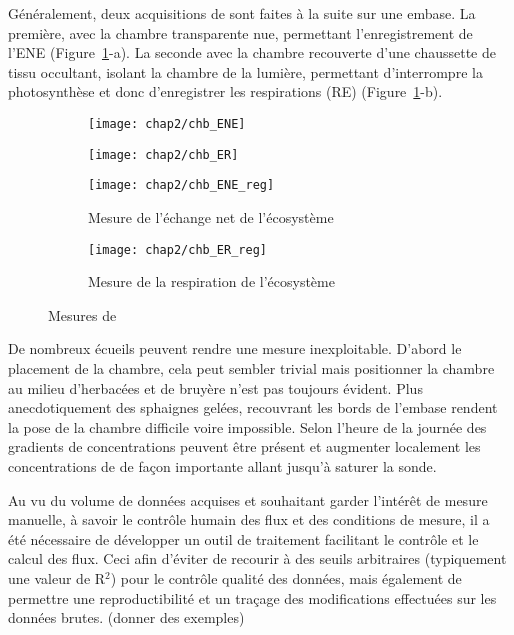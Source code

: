 Généralement, deux acquisitions de \coo sont faites à la suite sur une embase.
La première, avec la chambre transparente nue, permettant l'enregistrement de l'ENE (Figure~\ref{fig:chb}-a).
La seconde avec la chambre recouverte d'une chaussette de tissu occultant, isolant la chambre de la lumière, permettant d'interrompre la photosynthèse et donc d'enregistrer les respirations (RE) (Figure~\ref{fig:chb}-b).

\begin{figure}
	\centering
	\begin{subfigure}[t]{0.5\textwidth}
		\centering
		\texttt{[image: chap2/chb\_ENE]}
	\end{subfigure}%
	\begin{subfigure}[t]{0.5\textwidth}
		\centering
		\texttt{[image: chap2/chb\_ER]}
	\end{subfigure}%

	\begin{subfigure}[t]{0.5\textwidth}
		\texttt{[image: chap2/chb\_ENE\_reg]}
		\caption{Mesure de l'échange net de l'écosystème}
	\end{subfigure}%
	\begin{subfigure}[t]{0.5\textwidth}
		\texttt{[image: chap2/chb\_ER\_reg]}
		\caption{Mesure de la respiration de l'écosystème}
	\end{subfigure}
\caption{Mesures de \coo}
\label{fig:chb}
\end{figure}


De nombreux écueils peuvent rendre une mesure inexploitable. D'abord le placement de la chambre, cela peut sembler trivial mais positionner la chambre au milieu d'herbacées et de bruyère n'est pas toujours évident. Plus anecdotiquement des sphaignes gelées, recouvrant les bords de l'embase rendent la pose de la chambre difficile voire impossible. Selon l'heure de la journée des gradients de concentrations peuvent être présent et augmenter localement les concentrations de \coo de façon importante allant jusqu'à saturer la sonde.

Au vu du volume de données acquises et souhaitant garder l'intérêt de mesure manuelle, à savoir le contrôle humain des flux et des conditions de mesure, il a été nécessaire de développer un outil de traitement facilitant le contrôle et le calcul des flux.
Ceci afin d'éviter de recourir à des seuils arbitraires (typiquement une valeur de R$^{2}$) pour le contrôle qualité des données, mais également de permettre une reproductibilité et un traçage des modifications effectuées sur les données brutes.
(donner des exemples)

